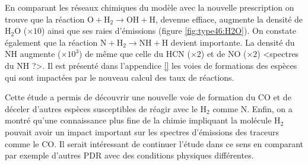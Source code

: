 En comparant les réseaux chimiques du modèle avec la nouvelle prescription on trouve que la réaction $\mathrm{O} + \mathrm{H}_2 \rightarrow \mathrm{OH} +  \mathrm{H}$, devenue effiace, augmente la densité de $\mathrm{H}_2\mathrm{O}$ ($\times 10$) ainsi que ses raies d'émissions (figure \ref{fig:type46:H2O}). On constate également que la réaction $\mathrm{N} + \mathrm{H}_2 \rightarrow  \mathrm{NH} +  \mathrm{H}$ devient importante. La densité du $\mathrm{NH}$ augmente ($\times 10^3$) de même que celle du $\mathrm{HCN}$ ($\times 2$) et de $\mathrm{NO}$ ($\times 2$) <spectres du $\mathrm{NH}$ ?>. Il est présenté dans l'appendice \ref{} les voies de formations des espèces qui sont impactées par le nouveau calcul des taux de réactions.\newline 

Cette étude a permis de découvrir une nouvelle voie de formation du $\mathrm{CO}$ et de déceler d'autres espèces susceptibles de réagir avec le $\mathrm{H}_2$ comme $\mathrm{N}$. Enfin, on a montré qu'une connaissance plus fine de la chimie impliquant la molécule $\mathrm{H}_2$ pouvait avoir un impact important sur les spectres d'émissions des traceurs comme le $\mathrm{CO}$. Il serait intéressant de continuer l'étude dans ce sens en comparant par exemple d'autres PDR avec des conditions physiques différentes.
